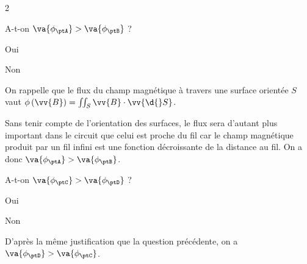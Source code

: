 \begin{multicols}{2}



\begin{enonce}
A-t-on $\va{\phi_\ptA} > \va{\phi_\ptB}$ ?	
	\begin{listeQCM1Colonne}
	\item Oui
	\item Non
	\end{listeQCM1Colonne}
\end{enonce}


\begin{corrigeNewpage}
On rappelle que le flux du champ magnétique à travers une surface
orientée $S$ vaut $\phi\left(\vv{B}\right)=\iint_{S}\vv{B}\cdot\vv{\d{} S}$. 

Sans tenir compte de l'orientation des surfaces, le flux sera d'autant
plus important dans le circuit que celui est proche du fil car le
champ magnétique produit par un fil infini est une fonction décroissante
de la distance au fil. On a donc $\va{\phi_\ptA} > \va{\phi_\ptB}$.
\end{corrigeNewpage}




\begin{enonce}
A-t-on $\va{\phi_\ptC} > \va{\phi_\ptD}$ ?
	
	\begin{listeQCM1Colonne}
	\item Oui
	\item Non
	\end{listeQCM1Colonne}


\end{enonce}


\begin{corrige}
D'après la même justification que la question précédente, on a $\va{\phi_\ptD} > \va{\phi_\ptC}$.
\end{corrige}


\end{multicols}



